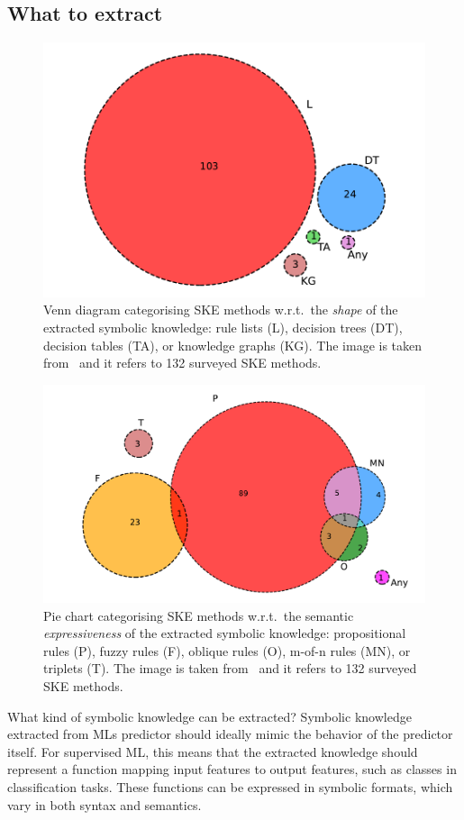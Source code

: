 \subsection{What to extract}\label{subsec:what-to-extract}
%
\begin{figure}
    \centering
    \includegraphics[width=.6\linewidth]{figures/ske-rule-shape}
    \caption[Venn diagram categorising SKE methods]{
        Venn diagram categorising \gls{SKE} methods w.r.t.\ the \emph{shape} of the extracted symbolic knowledge: rule lists (L), decision trees (DT), decision tables (TA), or knowledge graphs (KG).
        The image is taken from~\cite{DBLP:journals/csur/CiattoSAMO24} and it refers to 132 surveyed \gls{SKE} methods.
    }
    \label{fig:pie-ski-shape}
\end{figure}
%
\begin{figure}
    \centering
    \includegraphics[width=.6\linewidth]{figures/ske-rule-format}
    \caption[Pie chart categorising SKE methods]{
        Pie chart categorising \gls{SKE} methods w.r.t.\ the semantic \emph{expressiveness} of the extracted symbolic knowledge: propositional rules (P), fuzzy rules (F), oblique rules (O), m-of-n rules (MN), or triplets (T).
        The image is taken from~\cite{DBLP:journals/csur/CiattoSAMO24} and it refers to 132 surveyed \gls{SKE} methods.
    }
    \label{fig:pie-ski-expressiveness}
\end{figure}

What kind of symbolic knowledge can be extracted?
%
Symbolic knowledge extracted from \glspl{ML} predictor should ideally mimic the behavior of the predictor itself.
%
For supervised \gls{ML}, this means that the extracted knowledge should represent a function mapping input features to output features, such as classes in classification tasks.
%
These functions can be expressed in symbolic formats, which vary in both syntax and semantics.

